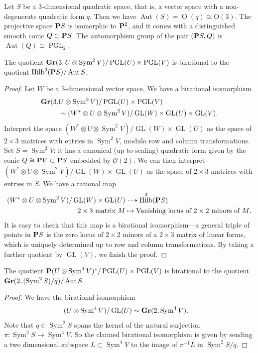 \documentclass{amsart}
\renewcommand {\P}{{\bf P}}
\providecommand {\Gr}{{\bf Gr}}
\providecommand{\GL}{\operatorname{GL}}
\providecommand{\PGL}{\operatorname{PGL}}
\providecommand {\from}{{\colon}}
\providecommand{\Aut}{\operatorname{Aut}}
\providecommand{\Sym}{\operatorname{Sym}}
\numberwithin{equation}{section}
\DeclareMathOperator{\Hilb}{Hilb}
\renewcommand{\O}{\mathcal O}
\begin{document}
Let $S$ be a 3-dimensional quadratic space, that is, a vector space with a non-degenerate quadratic form $q$.
Then we have $\Aut(S) =  \operatorname{O}(q) \cong \operatorname{O(3)}$.
The projective space $\P S$ is isomorphic to $\P^2$, and it comes with a distinguished smooth conic $Q \subset \P S$.
The automorphism group of the pair $(\P S, Q)$ is $\Aut(Q) \cong \PGL_2$.
\begin{lemma}\label{lem:quotgrass}
  The quotient $\Gr(3, U \otimes \Sym^2V) / \PGL(U) \times \PGL(V)$ is birational to the quotient $\Hilb^3(\P S) / \Aut S$.
\end{lemma}
\begin{proof}
  Let $W$ be a 3-dimensional vector space.
  We have a birational isomorphism
  \begin{align*}
    \Gr(3, &U \otimes \Sym^3 V) / \PGL(U) \times \PGL(V)\\
           &\sim (W^* \otimes U \otimes \Sym^2 V) / \GL(W) \times \GL(U) \times \GL(V).
  \end{align*}
  Interpret the space $(W^* \otimes U \otimes \Sym^2 V) / \GL(W) \times \GL(U)$ as the space of $2 \times 3$ matrices with entries in $\Sym^2 V$, modulo row and column transformations.
  Set $S = \Sym^2 V$; it has a canonical (up to scaling) quadratic form given by the conic $Q \cong \P V\subset \P S$ embedded by $\O(2)$.
  We can then interpret $(W^* \otimes U \otimes \Sym^2 V) / \GL(W) \times \GL(U)$ as the space of $2 \times 3$ matrices with entries in $S$.
  We have a rational map
  \begin{align*}
    (W^* \otimes U \otimes \Sym^2 V) / \GL(W) \times \GL(U) &\dashrightarrow
                                                              \Hilb^3(\P S) \\
    \text{$2 \times 3$ matrix $M$} &\mapsto \text{Vanishing locus of $2\times 2$ minors of $M$}.
  \end{align*}
  It is easy to check that this map is a birational isomorphism---a general triple of points in $\P S$ is the zero locus of $2 \times 2$ minors of a $2 \times 3$ matrix of linear forms, which is uniquely determined up to row and column transformations.
  By taking a further quotient by $\GL(V)$, we finish the proof.  
\end{proof}

\begin{lemma}\label{lem:quotram}
  The quotient $\P(U \otimes \Sym^4 V)^* / \PGL(U) \times \PGL(V)$ is birational to the quotient $\Gr(2, (\Sym^2 S)/q) / \Aut S$.
\end{lemma}
\begin{proof}
  We have the birational isomorphism
  \begin{align*}
    (U \otimes \Sym^4 V) / \GL(U) &\sim \Gr(2, \Sym^4 V).
  \end{align*}
  Note that $q \in \Sym^2S$ spans the kernel of the natural surjection $\pi \from \Sym^2 S \to \Sym^4 V$.
  So the claimed birational isomorphism is given by sending a two dimensional subspace $L \subset \Sym^4 V$ to the image of $\pi^{-1}L$ in $\Sym^2S/q$.
\end{proof}
\end{document}

